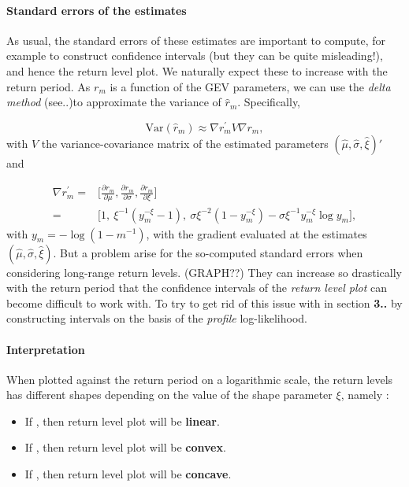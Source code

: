 \documentclass[11pt,a4paper,openany ]{book}
\begin{document}
\paragraph{Standard errors of the estimates}As usual, the standard errors of these estimates are important to compute, for example to construct confidence intervals (but they can be quite misleading!), and hence the return level plot. We naturally expect these to increase with the return period.
As $r_m$ is a function of the GEV parameters, we can use the \emph{delta method} (see..)to approximate the variance of $\hat{r}_m$. Specifically,

\begin{equation*}
\text{Var}(\hat{r}_m)\approx\nabla{r^{'}_m}V\nabla{r_m},
\end{equation*}
with $V$ the variance-covariance matrix of the estimated parameters $(\hat{\mu},\hat{\sigma},\hat{\xi})'$ and 

\begin{equation} \label{delta}
\begin{aligned}
\nabla r^{'}_m=
& \Bigg[\frac{\partial r_m}{\partial\mu},\frac{\partial r_m}{\partial\sigma},\frac{\partial r_m}{\partial\xi}\Bigg] \\ 
= & \Big[1,\ \xi^{-1}(y_m^{-\xi}-1),\ \sigma\xi^{-2}(1-y_m^{-\xi})-\sigma\xi^{-1}y_m^{-\xi}\log y_m\Big],
\end{aligned}
\end{equation}
with $y_m=-\log (1-m^{-1})$, with the gradient evaluated at the estimates $(\hat{\mu},\hat{\sigma},\hat{\xi})$.
But a problem arise for the so-computed standard errors when considering long-range return levels. (GRAPH??) They can increase so drastically with the return period that the confidence intervals of the \emph{return level plot} can become difficult to work with. To try to get rid of this issue with in section \textbf{3..} by constructing intervals on the basis of the \emph{profile} log-likelihood. 

\paragraph{Interpretation}

When plotted against the return period on a logarithmic scale, the return levels has different shapes depending on the value of the shape parameter $\xi$, namely :

\begin{itemize}
	\item If , then return level plot will be \textbf{linear}.
     \item If , then return level plot will be \textbf{convex}.
     \item If , then return level plot will be \textbf{concave}.
\end{itemize}
\end{document}
